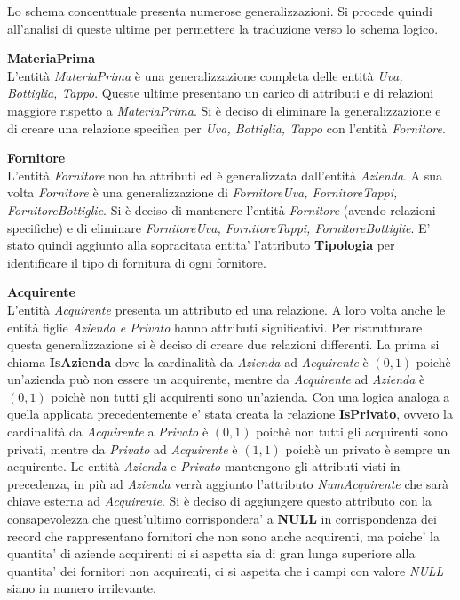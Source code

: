 Lo schema concenttuale presenta numerose generalizzazioni. Si procede quindi all'analisi di queste ultime per permettere la traduzione verso lo schema logico.
\begin{flushleft}
	\textbf{\large{MateriaPrima}}\\
	L'entità \emph{MateriaPrima} è una generalizzazione completa delle entità \emph{Uva, Bottiglia, Tappo}. Queste ultime presentano un carico di attributi e di relazioni maggiore rispetto a \emph{MateriaPrima}. Si è deciso di eliminare la generalizzazione e di creare una relazione specifica per \emph{Uva, Bottiglia, Tappo} con l'entità \emph{Fornitore}.
\end{flushleft}

\begin{flushleft}
	\textbf{\large{Fornitore}}\\
	L'entità \emph{Fornitore} non ha attributi ed è generalizzata dall'entità \emph{Azienda}. A sua volta \emph{Fornitore} è una generalizzazione di \emph{FornitoreUva, FornitoreTappi, FornitoreBottiglie}. Si è deciso di mantenere l'entità \emph{Fornitore} (avendo relazioni specifiche) e di eliminare \emph{FornitoreUva, FornitoreTappi, FornitoreBottiglie}. E' stato quindi aggiunto alla sopracitata entita' l'attributo \textbf{Tipologia} per identificare il tipo di fornitura di ogni fornitore.
\end{flushleft}


\begin{flushleft}
	\textbf{\large{Acquirente}}\\
	L'entità \emph{Acquirente} presenta un attributo ed una relazione. A loro volta anche le entità figlie \emph{Azienda e Privato} hanno attributi significativi. Per ristrutturare questa generalizzazione si è deciso di creare due relazioni differenti. La prima si chiama \textbf{IsAzienda} dove la cardinalità da \emph{Azienda} ad \emph{Acquirente} è $(0,1)$ poichè un'azienda può non essere un acquirente, mentre da \emph{Acquirente} ad \emph{Azienda} è $(0,1)$ poichè non tutti gli acquirenti sono un'azienda.
	Con una logica analoga a quella applicata precedentemente e' stata creata la relazione \textbf{IsPrivato}, ovvero la cardinalità da \emph{Acquirente} a \emph{Privato} è $(0,1)$ poichè non tutti gli acquirenti sono privati, mentre da \emph{Privato} ad \emph{Acquirente} è $(1,1)$ poichè un privato è sempre un acquirente. Le entità \emph{Azienda} e \emph{Privato} mantengono gli attributi visti in precedenza, in più ad \emph{Azienda} verrà aggiunto l'attributo \emph{NumAcquirente} che sarà chiave esterna ad \emph{Acquirente}. Si è deciso di aggiungere questo attributo con la consapevolezza che quest'ultimo corrispondera' a \textbf{NULL} in corrispondenza dei record che rappresentano fornitori che non sono anche acquirenti, ma poiche' la quantita' di aziende acquirenti ci si aspetta sia di gran lunga superiore alla quantita' dei fornitori non acquirenti, ci si aspetta che i campi con valore \emph{NULL} siano in numero irrilevante.
\end{flushleft}

